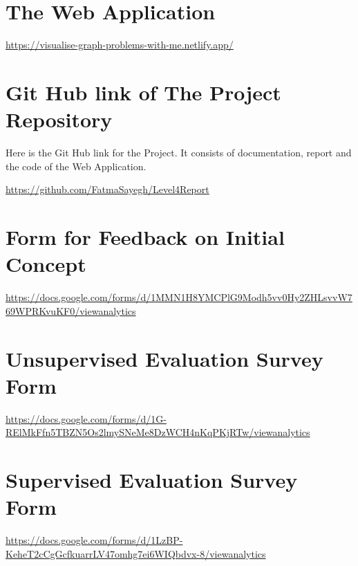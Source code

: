 
\section{The Web Application}
\href{https://visualise-graph-problems-with-me.netlify.app/} 
{https://visualise-graph-problems-with-me.netlify.app/}

\section{Git Hub link of The Project Repository}
\label{links: repository}
Here is the Git Hub link for the Project. It consists of documentation, report and the
code of the Web Application.

\href{https://github.com/FatmaSayegh/Level4Report} {https://github.com/FatmaSayegh/Level4Report}

\section{Form for Feedback on Initial Concept}
\href{https://docs.google.com/forms/d/1MMN1H8YMCPlG9Modh5vv0Hy2ZHLsvvW769WPRKvuKF0/viewanalytics} {https://docs.google.com/forms/d/1MMN1H8YMCPlG9Modh5vv0Hy2ZHLsvvW769WPRKvuKF0/viewanalytics}

\section{Unsupervised Evaluation Survey Form}
\label{links: unsupervised}
\href{https://docs.google.com/forms/d/1G-RElMkFfn5TBZN5Os2lmySNeMe8DzWCH4nKqPKjRTw/viewanalytics} {https://docs.google.com/forms/d/1G-RElMkFfn5TBZN5Os2lmySNeMe8DzWCH4nKqPKjRTw/viewanalytics}

\section{Supervised Evaluation Survey Form}
\label{links: supervised}
\href{https://docs.google.com/forms/d/1LzBP-KeheT2cCgGcfkuarrLV47omhg7ei6WIQbdvx-8/viewanalytics} {https://docs.google.com/forms/d/1LzBP-KeheT2cCgGcfkuarrLV47omhg7ei6WIQbdvx-8/viewanalytics}
